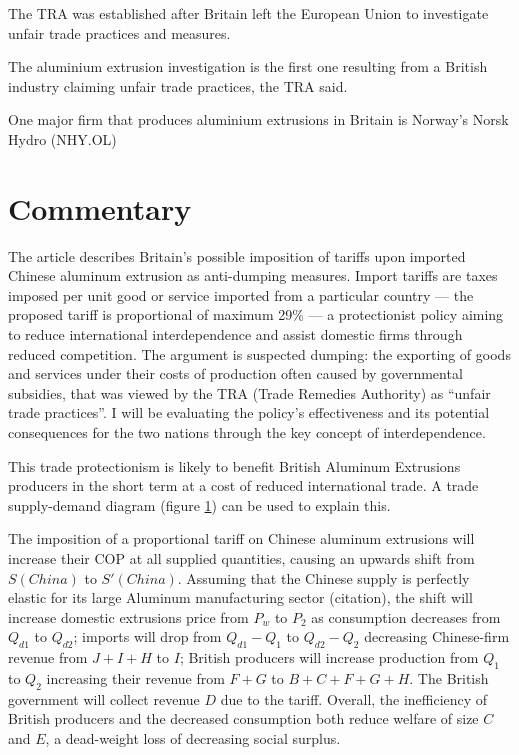 \documentclass[a4paper,12pt]{article}
\newcommand{\tikzfig}[1]{}
\begin{document}
The TRA was established after Britain left the European Union to investigate unfair trade practices and measures.

The aluminium extrusion investigation is the first one resulting from a British industry claiming unfair trade practices, the TRA said.

One major firm that produces aluminium extrusions in Britain is Norway's Norsk Hydro (NHY.OL)

\newpage
\section*{Commentary}


The article describes Britain's possible imposition of tariffs upon imported Chinese aluminum extrusion as anti-dumping measures. Import tariffs are taxes imposed per unit good or service imported from a particular country --- the proposed tariff is proportional of maximum 29\% --- a protectionist policy aiming to reduce international interdependence and assist domestic firms through reduced competition. The argument is suspected dumping: the exporting of goods and services under their costs of production often caused by governmental subsidies, that was viewed by the TRA (Trade Remedies Authority) as ``unfair trade practices''. I will be evaluating the policy's effectiveness and its potential consequences for the two nations through the key concept of interdependence.

This trade protectionism is likely to benefit British Aluminum Extrusions producers in the short term at a cost of reduced international trade. A trade supply-demand diagram (figure \ref{fig:tariff}) can be used to explain this.

\begin{figure}[H]
	\centering
	 \tikzfig{assets/tariffs.txt}
	\caption{}
	\label{fig:tariff}
\end{figure}

The imposition of a proportional tariff on Chinese aluminum extrusions will increase their COP at all supplied quantities, causing an upwards shift from $S(China)$ to $S'(China)$. Assuming that the Chinese supply is perfectly elastic for its large Aluminum manufacturing sector (citation), the shift will increase domestic extrusions price from $P_w$ to $P_2$ as consumption decreases from $Q_{d1}$ to $Q_{d2}$;
imports will drop from $Q_{d1}-Q_{1}$ to $Q_{d2}-Q_{2}$ decreasing Chinese-firm revenue from $J+I+H$ to $I$; British producers will increase production from $Q_1$ to $Q_2$ increasing their revenue from $F+G$ to $B+C+F+G+H$. The British government will collect revenue $D$ due to the tariff. Overall, the inefficiency of British producers and the decreased consumption both reduce welfare of size $C$ and $E$, a dead-weight loss of decreasing social surplus.
\end{document}
